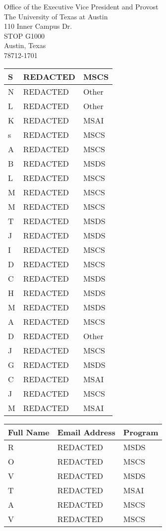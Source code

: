 \documentclass[11pt]{letter}
\begin{document}
\begin{letter}{Office of the Executive Vice President and Provost \\ The University of Texas at Austin \\ 110 Inner Campus Dr. \\ STOP G1000 \\ Austin, Texas \\ 78712-1701}
\begin{tabular}{|p{5cm}|p{6.7cm}|p{2.25cm}|}
        S & REDACTED & MSCS \\ \hline
        N & REDACTED & Other \\ \hline
        L & REDACTED & Other \\ \hline
        K & REDACTED & MSAI \\ \hline
        s & REDACTED & MSCS \\ \hline
        A & REDACTED & MSCS \\ \hline
        B & REDACTED & MSDS \\ \hline
        L & REDACTED & MSCS \\ \hline
        M & REDACTED & MSCS \\ \hline
        M & REDACTED & MSCS \\ \hline
        T & REDACTED & MSDS \\ \hline
        J & REDACTED & MSDS \\ \hline
        I & REDACTED & MSCS \\ \hline
        D & REDACTED & MSCS \\ \hline
        C & REDACTED & MSDS \\ \hline
        H & REDACTED & MSDS \\ \hline
        M & REDACTED & MSDS \\ \hline
        A & REDACTED & MSCS \\ \hline
        D & REDACTED & Other \\ \hline
        J & REDACTED & MSCS \\ \hline
        G & REDACTED & MSDS \\ \hline
        C & REDACTED & MSAI \\ \hline
        J & REDACTED & MSCS \\ \hline
        M & REDACTED & MSAI \\ \hline
    \end{tabular}
    \centering
    \begin{tabular}{|p{5cm}|p{6.7cm}|p{2.25cm}|}
        \hline
        \textbf{Full Name} & \textbf{Email Address} & \textbf{Program} \\ \hline
        R & REDACTED & MSDS \\ \hline
        O & REDACTED & MSCS \\ \hline
        V & REDACTED & MSDS \\ \hline
        T & REDACTED & MSAI \\ \hline
        A & REDACTED & MSCS \\ \hline
        V & REDACTED & MSCS \\ \hline

\end{tabular}
\end{letter}
\end{document}
